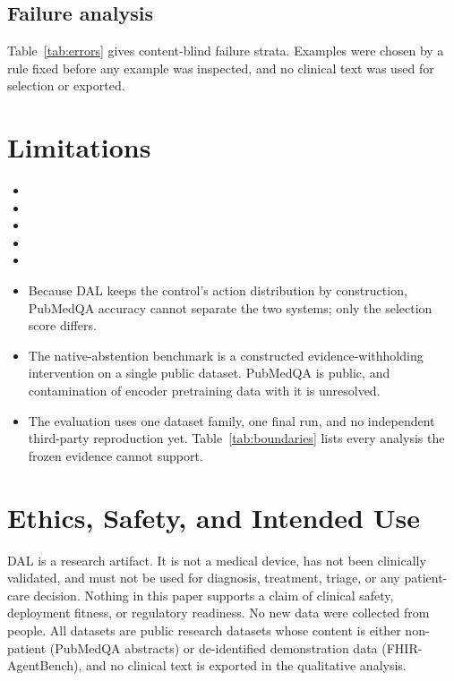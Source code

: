 \documentclass[11pt]{article}
\begin{document}
\subsection{Failure analysis}

Table~\ref{tab:errors} gives content-blind failure strata. Examples were chosen by a rule fixed before any
example was inspected, and no clinical text was used for selection or exported.



\section{Limitations}
\label{sec:limitations}

\begin{itemize}
\item {}
\item {}
\item {}
\item {}
\item {}
\item Because DAL keeps the control's action distribution by construction, PubMedQA accuracy cannot
      separate the two systems; only the selection score differs.
\item The native-abstention benchmark is a constructed evidence-withholding intervention on a single
      public dataset. PubMedQA is public, and contamination of encoder pretraining data with it is unresolved.
\item The evaluation uses one dataset family, one final run, and no independent third-party reproduction
      yet. Table~\ref{tab:boundaries} lists every analysis the frozen evidence cannot support.
\end{itemize}



\section{Ethics, Safety, and Intended Use}

DAL is a research artifact. It is not a medical device, has not been clinically validated, and must not
be used for diagnosis, treatment, triage, or any patient-care decision. Nothing in this paper supports a
claim of clinical safety, deployment fitness, or regulatory readiness. No new data were collected
from people. All datasets are public research datasets whose content is either non-patient (PubMedQA
abstracts) or de-identified demonstration data (FHIR-AgentBench), and no clinical text is exported in the
qualitative analysis.
\end{document}
